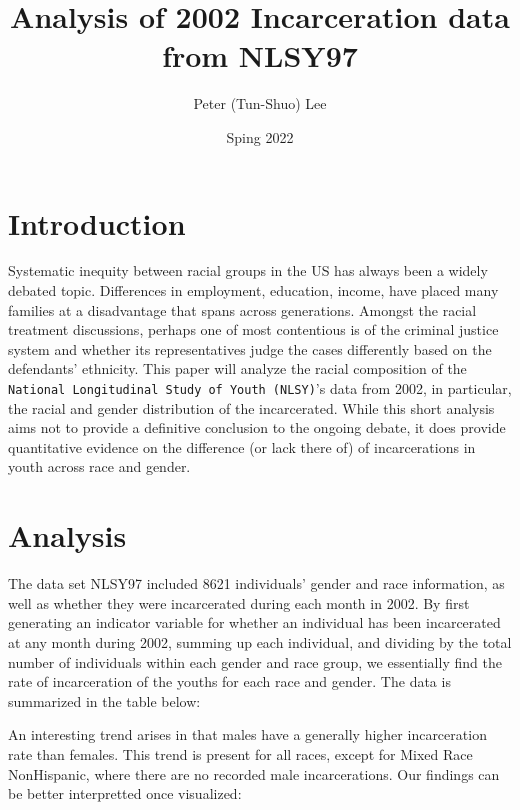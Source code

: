 \documentclass{article}
\author{Peter (Tun-Shuo) Lee }
\title{Analysis of 2002 Incarceration data from NLSY97}
\date{Sping 2022}
\begin{document}
\maketitle

\section{Introduction}

Systematic inequity between racial groups in the US has always been a widely debated topic. Differences in employment, education, income, have placed 
many families at a disadvantage that spans across generations. Amongst the racial treatment discussions, perhaps one of most contentious is of the criminal 
justice system and whether its representatives judge the cases differently based on the defendants' ethnicity. This paper will analyze the racial composition 
of the \texttt{National Longitudinal Study of Youth (NLSY)}'s data from 2002, in particular, the racial and gender distribution of the incarcerated. While this short analysis aims not to provide
a definitive conclusion to the ongoing debate, it does provide quantitative evidence on the difference (or lack there of) of incarcerations in youth across race and gender.  

\newpage

\section{Analysis}
The data set NLSY97 included 8621 individuals' gender and race information, as well as whether they were incarcerated during each month in 2002. 
By first generating an indicator variable for whether an individual has been incarcerated at any month during 2002, summing up each individual, and dividing by the total number of individuals within each gender and race group, we essentially find the rate of incarceration of the youths for each race and gender. The data is summarized in the table below: 



An interesting trend arises in that males have a generally higher incarceration rate than females. This trend is present for all races, except for Mixed Race NonHispanic, where there are no recorded 
male incarcerations. Our findings can be better interpretted once visualized: 
\end{document}
